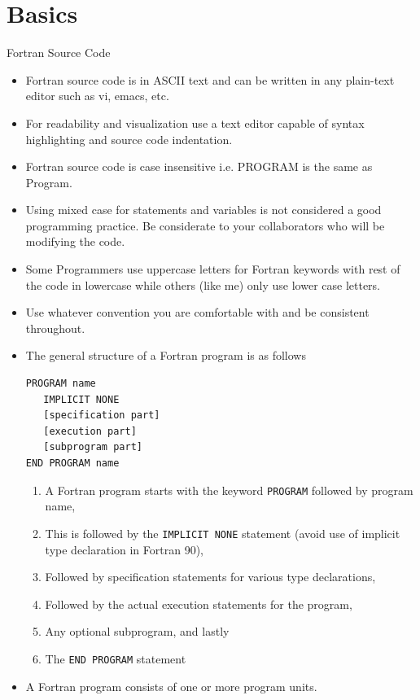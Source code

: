 \documentclass[c,mathserif,compress,xcolor=svgnames]{beamer}
\newcommand{\lstfortran}[1]{\lstinline[language={[90]Fortran},basicstyle=\footnotesize\ttfamily]|#1|}
\begin{document}
\section{Basics}
\begin{frame}{Fortran Source Code}
  \begin{itemize}
    \item Fortran source code is in ASCII text and can be written in any plain-text editor such as vi, emacs, etc.
    \item For readability and visualization use a text editor capable of syntax highlighting and source code indentation.
    \item Fortran source code is case insensitive i.e. PROGRAM is the same as Program.
    \item Using mixed case for statements and variables is not considered a good programming practice. Be considerate to your collaborators who will be modifying the code.
    \item Some Programmers use uppercase letters for Fortran keywords with rest of the code in lowercase while others (like me) only use lower case letters.
    \item Use whatever convention you are comfortable with and be consistent throughout.
    \item The general structure of a Fortran program is as follows
      \begin{lstlisting}[language={[90]Fortran}]
PROGRAM name
   IMPLICIT NONE
   [specification part]
   [execution part]
   [subprogram part]
END PROGRAM name
      \end{lstlisting}
      \begin{enumerate}
        \item A Fortran program starts with the keyword \lstfortran{PROGRAM} followed by program name,
        \item This is followed by the \lstfortran{IMPLICIT NONE} statement (avoid use of implicit type declaration in Fortran 90),
        \item Followed by specification statements for various type declarations,
        \item Followed by the actual execution statements for the program,
        \item Any optional subprogram, and lastly
        \item The \lstfortran{END PROGRAM} statement
      \end{enumerate}
      \framebreak
    \item A Fortran program consists of one or more program units.

\end{itemize}
\end{frame}
\end{document}
